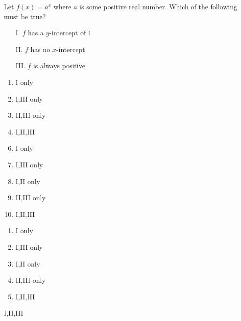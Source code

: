 



 Let $f(x)=a^{x}$ where $a$ is some positive real number.  Which of the following must be true? 
\begin{enumerate}[label=\Roman*.]
\item [I.] $f$ has a $y$-intercept of $1$
\item[II.] $f$ has no $x$-intercept
\item[III.] $f$ is always positive
\end{enumerate}



\ifsat
	\begin{enumerate}[label=\Alph*)]
		\item   I only
		\item  I,III only
		\item  II,III only
		\item  I,II,III%
	\end{enumerate}
\else
\fi

\ifacteven
	\begin{enumerate}[label=\textbf{\Alph*.},itemsep=\fill,align=left]
		\setcounter{enumii}{5}
		\item   I only
		\item  I,III only
		\item  I,II only
		\addtocounter{enumii}{1}
		\item  II,III only
		\item  I,II,III%
	\end{enumerate}
\else
\fi

\ifactodd
	\begin{enumerate}[label=\textbf{\Alph*.},itemsep=\fill,align=left]
		\item   I only
		\item  I,III only
		\item  I,II only
		\item  II,III only
		\item  I,II,III%
	\end{enumerate}
\else
\fi

\ifgridin
  I,II,III%

\else
\fi

